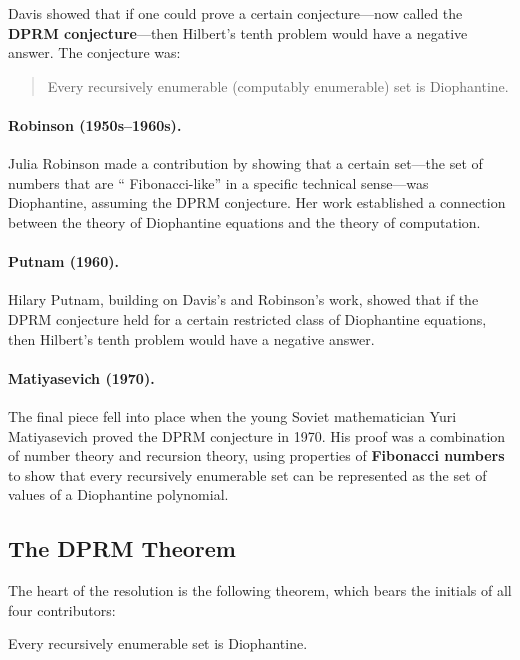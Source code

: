 Davis showed that if one could prove a certain conjecture---now called the \textbf{DPRM conjecture}---then Hilbert's tenth problem would have a negative answer. The conjecture was:

\begin{quote}
Every recursively enumerable (computably enumerable) set is Diophantine.
\end{quote}

\paragraph{Robinson (1950s--1960s).} Julia Robinson made a contribution by showing that a certain set---the set of numbers that are `` Fibonacci-like'' in a specific technical sense---was Diophantine, assuming the DPRM conjecture. Her work established a connection between the theory of Diophantine equations and the theory of computation.

\paragraph{Putnam (1960).} Hilary Putnam, building on Davis's and Robinson's work, showed that if the DPRM conjecture held for a certain restricted class of Diophantine equations, then Hilbert's tenth problem would have a negative answer.

\paragraph{Matiyasevich (1970).} The final piece fell into place when the young Soviet mathematician Yuri Matiyasevich proved the DPRM conjecture in 1970. His proof was a combination of number theory and recursion theory, using properties of \textbf{Fibonacci numbers} to show that every recursively enumerable set can be represented as the set of values of a Diophantine polynomial.

\subsection{The DPRM Theorem}

The heart of the resolution is the following theorem, which bears the initials of all four contributors:

\begin{theorem}
\label{thm:dprm}
Every recursively enumerable set is Diophantine.
\end{theorem}

